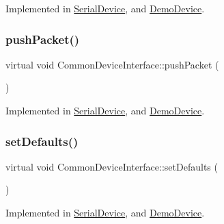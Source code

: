 Implemented in \hyperlink{class_serial_device_a8ae456ccffcf8afccdfe49357aed3e06}{Serial\+Device}, and \hyperlink{class_demo_device_a064f0bc683663200243bd68ff3713c68}{Demo\+Device}.

\hypertarget{class_common_device_interface_a682446d40e63ab7e6aa95dae7e0cd83b}{}\label{class_common_device_interface_a682446d40e63ab7e6aa95dae7e0cd83b} 
\subsubsection{\texorpdfstring{push\+Packet()}{pushPacket()}}
{\footnotesize\ttfamily virtual void Common\+Device\+Interface\+::push\+Packet (\begin{DoxyParamCaption}\item[{\hyperlink{class_fly_packet}{Fly\+Packet}}]{ }\end{DoxyParamCaption})\hspace{0.3cm}{\ttfamily [pure virtual]}}



Implemented in \hyperlink{class_serial_device_a35408d01afb4c48bc259dc601d2b0bf7}{Serial\+Device}, and \hyperlink{class_demo_device_ac39f46589b28926cd40635ad42342a54}{Demo\+Device}.

\hypertarget{class_common_device_interface_a542621a8b9e023531cae26447b2f8447}{}\label{class_common_device_interface_a542621a8b9e023531cae26447b2f8447} 
\subsubsection{\texorpdfstring{set\+Defaults()}{setDefaults()}}
{\footnotesize\ttfamily virtual void Common\+Device\+Interface\+::set\+Defaults (\begin{DoxyParamCaption}{ }\end{DoxyParamCaption})\hspace{0.3cm}{\ttfamily [pure virtual]}}



Implemented in \hyperlink{class_serial_device_a08a8a19f8a25c1dc7593c91afc7d55bd}{Serial\+Device}, and \hyperlink{class_demo_device_a79a9c22e60aca99c7667990bedc461c8}{Demo\+Device}.

